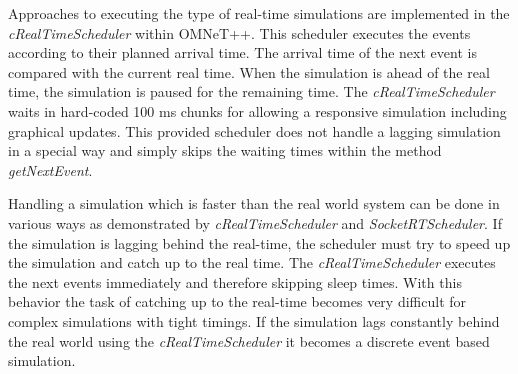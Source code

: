 
Approaches to executing the type of real-time simulations are implemented in the \emph{cRealTimeScheduler} within OMNeT++.
This scheduler executes the events according to their planned arrival time.
The arrival time of the next event is compared with the current real time.
When the simulation is ahead of the real time, the simulation is paused for the remaining time.
The \emph{cRealTimeScheduler} waits in hard-coded 100 ms chunks for allowing a responsive simulation including graphical updates.
This provided scheduler does not handle a lagging simulation in a special way and simply skips the waiting times within the method \emph{getNextEvent}. \cite[cRealTimeScheduler]{omnet_api}



Handling a simulation which is faster than the real world system can be done in various ways as demonstrated by \emph{cRealTimeScheduler} and \emph{SocketRTScheduler}.
If the simulation is lagging behind the real-time, the scheduler must try to speed up the simulation and catch up to the real time.
The \emph{cRealTimeScheduler} executes the next events immediately and therefore skipping sleep times.
With this behavior the task of catching up to the real-time becomes very difficult for complex simulations with tight timings.
If the simulation lags constantly behind the real world using the \emph{cRealTimeScheduler} it becomes a discrete event based simulation.

